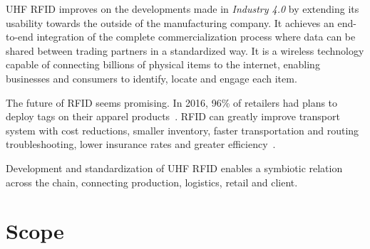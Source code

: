 \gls{UHF RFID} improves on the developments made in \emph{Industry 4.0} by extending its usability towards the outside of the manufacturing company. It achieves an end-to-end integration of the complete commercialization process where data can be shared between trading partners in a standardized way. It is a wireless technology capable of connecting billions of physical items to the internet, enabling businesses and consumers to identify, locate and engage each item.

The future of \gls{RFID} seems promising. In 2016, 96\% of retailers had plans to deploy tags on their apparel products~\cite{hardgrave2016StateRFID}. \gls{RFID} can greatly improve transport system with cost reductions, smaller inventory, faster transportation and routing troubleshooting, lower insurance rates and greater efficiency~\cite{oanaRFIDTechnologyContainers2013}.

Development and standardization of \gls{UHF RFID} enables a symbiotic relation across the chain, connecting production, logistics, retail and client.

\section{Scope}









